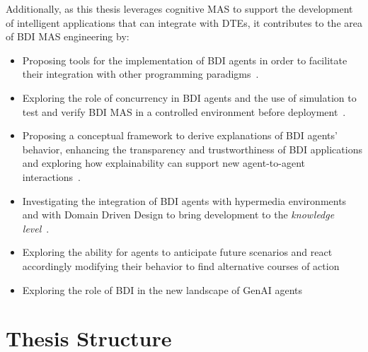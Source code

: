 Additionally, as this thesis leverages cognitive \ac{MAS} to support the development of intelligent applications that can integrate with \acp{DTE}, it contributes to the area of \ac{BDI} \ac{MAS} engineering by:  
\begin{itemize}
  \item Proposing tools for the implementation of \ac{BDI} agents in order to facilitate their integration with other programming paradigms~\cite{DBLP:journals/sncs/BaiardiBCP24,DBLP:conf/eumas/BaiardiBCP23,DBLP:conf/acsos/PianiniBBC24}.
  
  \item Exploring the role of concurrency in \ac{BDI} agents and the use of simulation to test and verify \ac{BDI} \ac{MAS} in a controlled environment before deployment~\cite{baiardi2025jaktasim,DBLP:conf/atal/BaiardiBCPOR24,DBLP:conf/emas/BaiardiBCPRO24}.
  
  \item Proposing a conceptual framework to derive explanations of \ac{BDI} agents' behavior, enhancing the transparency and trustworthiness of \ac{BDI} applications and exploring how explainability can support new agent-to-agent interactions~\cite{DBLP:journals/aamas/YanBHR25,DBLP:conf/woa/YanBHR23,beaumont2025explain,beaumont2025engineering}.

  \item Investigating the integration of \ac{BDI} agents with hypermedia environments and with Domain Driven Design to bring development to the \emph{knowledge level}~\cite{burattini2025gap,DBLP:conf/emas/BurattiniCGR23,DBLP:conf/emas/RicciBCC24,ricci2025concpeptual,DBLP:conf/emas/RicciBCC24,DBLP:conf/atal/LemeeBMC23,RAMANATHAN2022217}.

  \item Exploring the ability for agents to anticipate future scenarios and react accordingly modifying their behavior to find alternative courses of action \cite{DBLP:journals/aamas/HubnerBRM25,wesaac}

  \item Exploring the role of \ac{BDI} in the new landscape of \ac{GenAI} agents~\cite{DBLP:conf/atal/Ricci0ZBC24,ciatto2025generative}
\end{itemize}


\section*{Thesis Structure}

